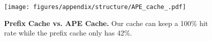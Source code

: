 \begin{figure}[ht]
    \centering
    \texttt{[image: figures/appendix/structure/APE\_cache\_.pdf]}
    \caption{\textbf{Prefix Cache vs. APE Cache.} Our cache can keep a 100\% hit rate while the prefix cache only has 42\%.} 
    \label{fig:app:ape_cache}
\end{figure}